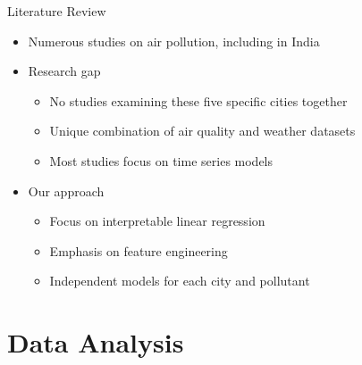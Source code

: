 \documentclass[svgnames, 12pt]{beamer}
\begin{document}
\begin{frame}{Literature Review}
    \begin{itemize}
        \item Numerous studies on air pollution, including in India
        \item Research gap
            \begin{itemize}
                \item No studies examining these five specific cities together
                \item Unique combination of air quality and weather datasets
                \item Most studies focus on time series models
            \end{itemize}
        \item Our approach
            \begin{itemize}
                \item Focus on interpretable linear regression
                \item Emphasis on feature engineering
                \item Independent models for each city and pollutant
            \end{itemize}
    \end{itemize}
\end{frame}

\section{Data Analysis}
\end{document}
